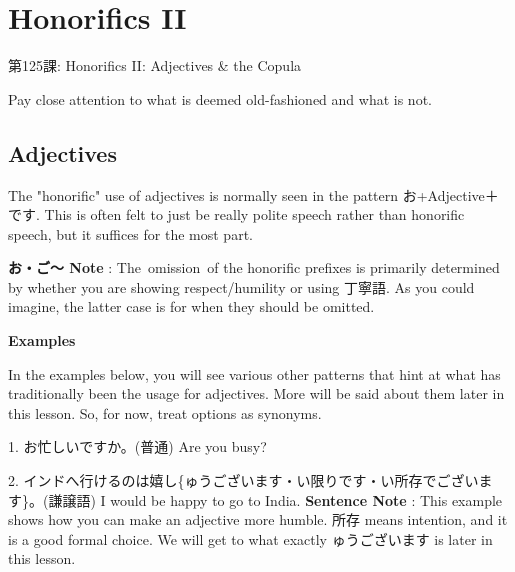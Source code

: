     
\chapter{Honorifics II}

\begin{center}
\begin{Large}
第125課: Honorifics II: Adjectives \& the Copula 
\end{Large}
\end{center}
 
\par{ Pay close attention to what is deemed old-fashioned and what is not. }
      
\section{Adjectives}
 
\par{  The "honorific" use of adjectives is normally seen in the pattern お+Adjective＋です. This is often felt to just be really polite speech rather than honorific speech, but it suffices for the most part. }

\par{\textbf{お・ご～ Note }: The omission of the honorific prefixes is primarily determined by whether you are showing respect\slash humility or using 丁寧語. As you could imagine, the latter case is for when they should be omitted. }

\begin{center}
 \textbf{Examples }
\end{center}

\par{ In the examples below, you will see various other patterns that hint at what has traditionally been the usage for adjectives. More will be said about them later in this lesson. So, for now, treat options as synonyms. }
 
\par{1. お忙しいですか。(普通) \hfill\break
Are you busy? }
 
\par{2. インドへ行けるのは嬉し\{ゅうございます・い限りです・い所存でございます\}。(謙譲語) \hfill\break
I would be happy to go to India. \hfill\break
\hfill\break
\textbf{Sentence Note }: This example shows how you can make an adjective more humble. 所存 means intention, and it is a good formal choice. We will get to what exactly ゅうございます is later in this lesson. }
 
